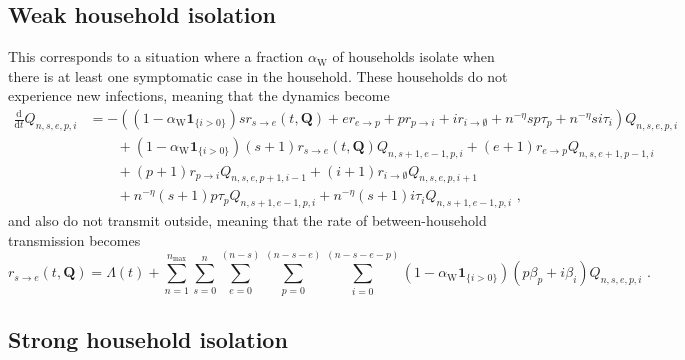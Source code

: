 \documentclass[10pt,a4paper]{article}
\newcommand{\be}{\begin{equation}}
\newcommand{\ee}{\end{equation}}
\newcommand{\ba}{\begin{equation} \begin{aligned}}
\newcommand{\ea}{\end{aligned} \end{equation}}
\newcommand{\ddt}[1]{\frac{\mathrm{d}#1}{\mathrm{d}t}}
\newcommand{\indic}[1]{\mathbf{1}_{\{#1\}}}
\begin{document}
\subsection{Weak household isolation}

This corresponds to a situation where a fraction $\alpha_{\mathrm{W}}$ of
households isolate when there is at least one symptomatic case in the
household. These households do not experience new infections, meaning
that the dynamics become
\ba
\ddt{}Q_{n,s,e,p,i} & = - \left(
\left(1-\alpha_{\mathrm{W}} \indic{i>0} \right)s r_{s\rightarrow e}(t,\mathbf{Q})
+ e r_{e\rightarrow p} + p r_{p\rightarrow i} + i r_{i\rightarrow \emptyset} 
+ n^{-\eta}s p \tau_p  + n^{-\eta}s i  \tau_i \right) Q_{n,s,e,p,i}
\\ & \qquad
+ \left(1-\alpha_{\mathrm{W}} \indic{i>0} \right)
(s+1) r_{s\rightarrow e}(t,\mathbf{Q}) Q_{n,s+1,e-1,p,i}
+ (e+1) r_{e\rightarrow p} Q_{n,s,e+1,p-1,i}
\\ & \qquad
+ (p+1) r_{p\rightarrow i} Q_{n,s,e,p+1,i-1}
+ (i+1) r_{i\rightarrow \emptyset} Q_{n,s,e,p,i+1}
\\ & \qquad
+ n^{-\eta}(s+1) p \tau_p Q_{n,s+1,e-1,p,i}
+ n^{-\eta}(s+1) i \tau_i Q_{n,s+1,e-1,p,i}
\text{ ,}
\ea
and also do not transmit outside, meaning that the rate of between-household
transmission becomes
\be
r_{s\rightarrow e}(t,\mathbf{Q}) = \Lambda(t) +
\sum_{n=1}^{n_{\mathrm{max}}}
\sum_{s=0}^{n}
\sum_{e=0}^{(n-s)}
\sum_{p=0}^{(n-s-e)}
\sum_{i=0}^{(n-s-e-p)}
\left(1-\alpha_{\mathrm{W}} \indic{i>0} \right) \left(p \beta_p + i \beta_i \right)
 Q_{n,s,e,p,i}
\text{ .}
\ee

\subsection{Strong household isolation}
\end{document}
